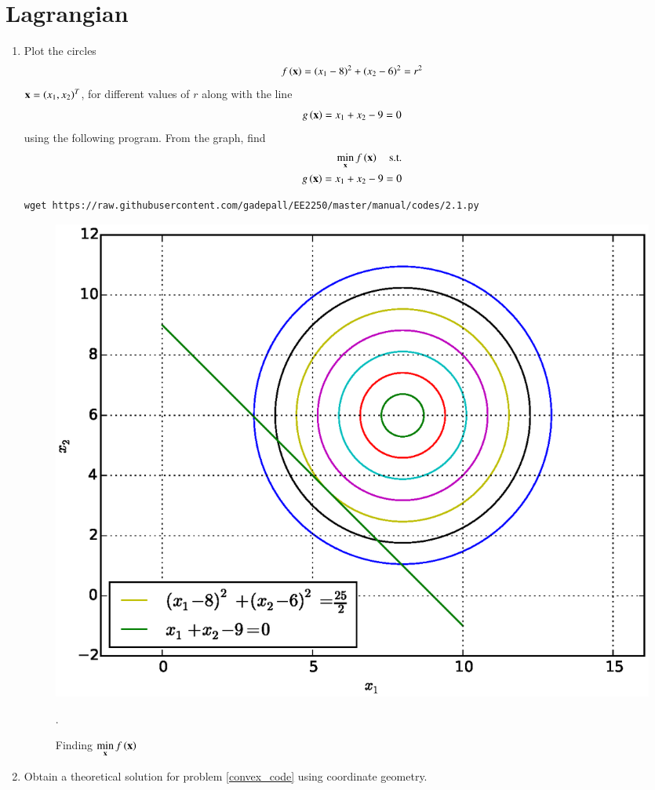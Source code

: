\documentclass[journal,12pt,twocolumn]{IEEEtran}
\renewcommand\thesection{\arabic{section}}
\begin{document}
\section{Lagrangian}
\begin{enumerate}[label=\thesection.\arabic*,ref=\thesection.\theenumi]

\item
	\label{convex_code}
	Plot the circles 
%
\begin{equation}
\label{eq2_1_circ}
f\left(\mathbf{x}\right) = (x_1-8)^2 + (x_2-6)^2 = r^2
\end{equation}
%
 $\mathbf{x}= \left(x_1,x_2\right)^{T}$, for different values of $r$ along with the line 
%
\begin{equation}
\label{eq2_1_line}
g\left(\mathbf{x}\right) = x_1 + x_2 - 9 = 0
\end{equation} 
%
using the following program.	From the graph, find
\begin{align}
	\min_{\mathbf{x}}f\left(\mathbf{x}\right) \quad \text{s.t.} \\
	g\left(\mathbf{x}\right) = x_1 + x_2 - 9 = 0
\end{align}
%

%	
\begin{lstlisting}
wget https://raw.githubusercontent.com/gadepall/EE2250/master/manual/codes/2.1.py
\end{lstlisting}

%
\begin{figure}[!ht]
\centering
\includegraphics[width=\columnwidth]{./figs/2.1.eps}
\caption{ Finding $ \displaystyle \min_{\mathbf{x}}f\left(\mathbf{x}\right)$}.
\label{fig.2.1}	
\end{figure}
%
\item
Obtain a theoretical solution for problem \ref{convex_code} using coordinate geometry.


\end{enumerate}
\end{document}
